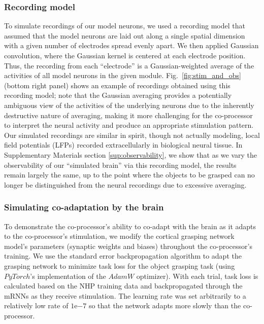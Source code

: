\documentclass[12pt]{iopart}
\begin{document}
\subsubsection{Recording model}
To simulate recordings of our model neurons, we used a recording model that assumed that the model neurons
are laid out along a single spatial dimension with a given number of electrodes spread evenly apart.
We then applied Gaussian convolution, where the Gaussian kernel is centered at each electrode position.
Thus, the recording from each ``electrode'' is a Gaussian-weighted average of the activities of all model neurons
in the given module. Fig.~\ref{fig:stim_and_obs} (bottom right panel) shows an example of recordings obtained
using this recording model; note that the Gaussian averaging provides a potentially ambiguous view of the
activities of the underlying neurons due to the inherently destructive nature of averaging, making it
more challenging for the co-processor to interpret the neural activity and produce an appropriate
stimulation pattern. Our simulated recordings are similar in spirit, though not actually modeling,
local field potentials (LFPs) recorded extracellularly in biological neural tissue. In Supplementary Materials section
\ref{sup:observability}, we show that as we vary the observability of our ``simulated brain'' via this recording
model, the results remain largely the same, up to the point where the objects to be grasped can no longer be
distinguished from the neural recordings due to excessive averaging. 

\subsubsection{Simulating co-adaptation by the brain}
To demonstrate the co-processor's ability to co-adapt with the brain as it adapts to the co-processor's
stimulation, we modify the cortical grasping network model's parameters (synaptic weights and biases) throughout
the co-processor's training. We use the standard error backpropagation algorithm to adapt the grasping network to
minimize task loss for the object grasping task (using $PyTorch$'s implementation of the $AdamW$ optimizer). With each
trial, task loss is calculated based on the NHP training data and backpropagated through the mRNNs as they receive
stimulation. The learning rate was set arbitrarily to a relatively low rate of $1\mathrm{e}{-7}$ so that the network
adapts more slowly than the co-processor.
\end{document}
